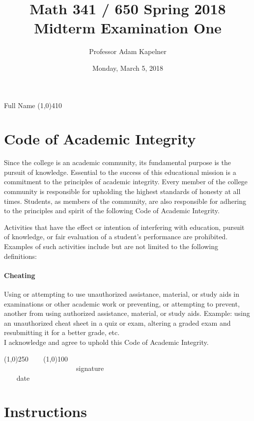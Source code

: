 \documentclass[12pt]{article}
\title{Math 341 / 650 Spring 2018 \\ Midterm Examination One}
\author{Professor Adam Kapelner}
\date{Monday, March 5, 2018}
\begin{document}
\maketitle

\noindent Full Name \line(1,0){410}

\thispagestyle{empty}

\section*{Code of Academic Integrity}

\footnotesize
Since the college is an academic community, its fundamental purpose is the pursuit of knowledge. Essential to the success of this educational mission is a commitment to the principles of academic integrity. Every member of the college community is responsible for upholding the highest standards of honesty at all times. Students, as members of the community, are also responsible for adhering to the principles and spirit of the following Code of Academic Integrity.

Activities that have the effect or intention of interfering with education, pursuit of knowledge, or fair evaluation of a student's performance are prohibited. Examples of such activities include but are not limited to the following definitions:

\paragraph{Cheating} Using or attempting to use unauthorized assistance, material, or study aids in examinations or other academic work or preventing, or attempting to prevent, another from using authorized assistance, material, or study aids. Example: using an unauthorized cheat sheet in a quiz or exam, altering a graded exam and resubmitting it for a better grade, etc.
\\

\noindent I acknowledge and agree to uphold this Code of Academic Integrity. \\

\begin{center}
\line(1,0){250} ~~~ \line(1,0){100}\\
~~~~~~~~~~~~~~~~~~~~~signature~~~~~~~~~~~~~~~~~~~~~~~~~~~~~~~~~~~~~~~~~~~~~ date
\end{center}

\normalsize

\section*{Instructions}
\end{document}
